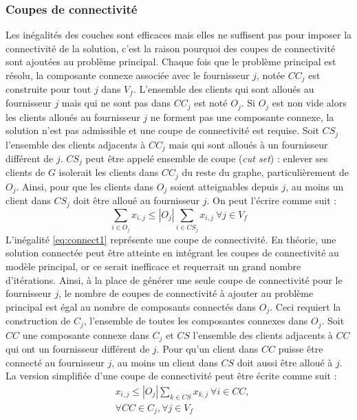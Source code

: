 \documentclass[letterpaper]{article}
\begin{document}
\subsubsection*{Coupes de connectivité}
Les inégalités des couches sont efficaces mais elles ne suffisent pas pour imposer la connectivité de la solution, c'est la raison pourquoi des coupes de connectivité sont ajoutées au problème principal. \newline \indent
Chaque fois que le problème principal est résolu, la composante connexe associée avec le fournisseur $j$, notée $CC_{j}$ est construite pour tout $j$ dans $V_{f}$. L'ensemble des clients qui sont alloués au fournisseur $j$ mais qui ne sont pas dans $CC_{j}$ est noté $O_{j}$.\newline \indent
Si $O_{j}$ est non vide alors les clients alloués au fournisseur $j$ ne forment pas une composante connexe, la solution n'est pas admissible et une coupe de connectivité est requise. Soit $CS_{j}$ l'ensemble des clients adjacents à $CC_{j}$ mais qui sont alloués à un fournisseur différent de $j$. $CS_{j}$ peut être appelé ensemble de coupe (\textit{cut set}) : enlever ses clients de $G$ isolerait les clients dans $CC_{j}$ du reste du graphe, particulièrement de $O_{j}$. Ainsi, pour que les clients dans $O_{j}$ soient atteignables depuis $j$, au moins un client dans $CS_{j}$ doit être alloué au fournisseur $j$. On peut l'écrire comme suit : 
\begin{equation}\label{eq:connect1}
\sum_{i \in O_{j}}{x_{i,j}} \leq |O_{j}|\sum_{i \in CS_{j}}{x_{i,j}} \ \forall j \in V_{f}
\end{equation}
L'inégalité \eqref{eq:connect1} représente une coupe de connectivité. En théorie, une solution connectée peut être atteinte en intégrant les coupes de connectivité au modèle principal, or ce serait inefficace et requerrait un grand nombre d'itérations. Ainsi, à la place de générer une seule coupe de connectivité pour le fournisseur $j$, le nombre de coupes de connectivité à ajouter au problème principal est égal au nombre de composants connectés dans $O_{j}$. Ceci requiert la construction de $C_{j}$, l'ensemble de toutes les composantes connexes dans $O_{j}$. Soit $CC$ une composante connexe dans $C_{j}$ et $CS$ l'ensemble des clients adjacents à $CC$  qui ont un fournisseur différent de $j$. Pour qu'un client dans $CC$ puisse être connecté au fournisseur $j$, au moins un client dans $CS$ doit aussi être alloué à $j$. La version simplifiée d'une coupe de connectivité peut être écrite comme suit :
\begin{align*}
&x_{i,j} \leq |O_{j}|\sum_{k \in CS}{x_{k,j}} \ \forall i \in CC, \\ 
&\forall CC \in C_{j}, \forall j \in V_{f}\\ 
\end{align*}
\end{document}
